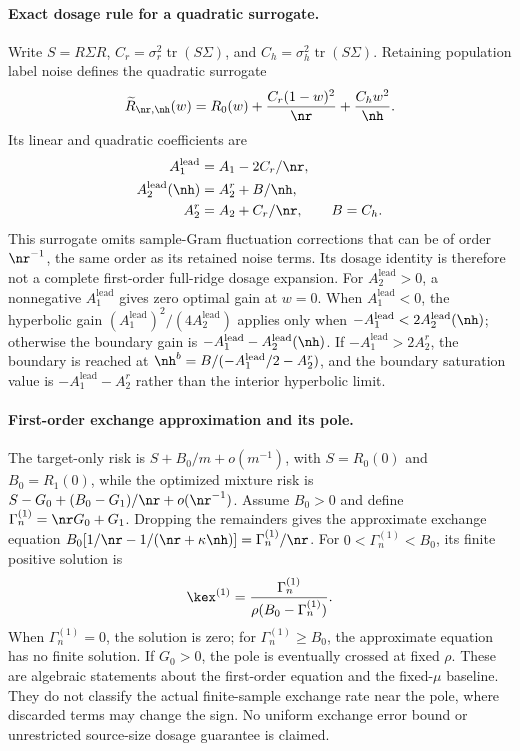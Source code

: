 \paragraph{Exact dosage rule for a quadratic surrogate.}
Write $S=R\Sigma R$, $C_r=\sigma_r^2\operatorname{tr}(S\Sigma)$, and $C_h=\sigma_h^2\operatorname{tr}(S\Sigma)$. Retaining population label noise defines the quadratic surrogate
\begin{equation}
 \widetilde R_{\nr,\nh}(w)=R_0(w)+\frac{C_r(1-w)^2}{\nr}+\frac{C_hw^2}{\nh}.
 \label{supp:eq:surrogate-dose}
\end{equation}
Its linear and quadratic coefficients are
\begin{align}
 A_1^{\mathrm{lead}}&=A_1-2C_r/\nr,\notag\\
 A_2^{\mathrm{lead}}(\nh)&=A_2^r+B/\nh,\notag\\
 A_2^r&=A_2+C_r/\nr,\qquad B=C_h.
\end{align}
This surrogate omits sample-Gram fluctuation corrections that can be of order $\nr^{-1}$, the same order as its retained noise terms. Its dosage identity is therefore not a complete first-order full-ridge dosage expansion. For $A_2^{\mathrm{lead}}>0$, a nonnegative $A_1^{\mathrm{lead}}$ gives zero optimal gain at $w=0$. When $A_1^{\mathrm{lead}}<0$, the hyperbolic gain $(A_1^{\mathrm{lead}})^2/(4A_2^{\mathrm{lead}})$ applies only when $-A_1^{\mathrm{lead}}<2A_2^{\mathrm{lead}}(\nh)$; otherwise the boundary gain is $-A_1^{\mathrm{lead}}-A_2^{\mathrm{lead}}(\nh)$. If $-A_1^{\mathrm{lead}}>2A_2^r$, the boundary is reached at $\nh^b=B/(-A_1^{\mathrm{lead}}/2-A_2^r)$, and the boundary saturation value is $-A_1^{\mathrm{lead}}-A_2^r$ rather than the interior hyperbolic limit.

\paragraph{First-order exchange approximation and its pole.}
The target-only risk is $S+B_0/m+o(m^{-1})$, with $S=R_0(0)$ and $B_0=R_1(0)$, while the optimized mixture risk is $S-G_0+(B_0-G_1)/\nr+o(\nr^{-1})$. Assume $B_0>0$ and define $\Gamma_n^{(1)}=\nr G_0+G_1$. Dropping the remainders gives the approximate exchange equation
$B_0[1/\nr-1/(\nr+\kappa\nh)]=\Gamma_n^{(1)}/\nr$.
For $0<\Gamma_n^{(1)}<B_0$, its finite positive solution is
\begin{equation}
 \kex^{(1)}=\frac{\Gamma_n^{(1)}}{\rho(B_0-\Gamma_n^{(1)})}.
\end{equation}
When $\Gamma_n^{(1)}=0$, the solution is zero; for $\Gamma_n^{(1)}\ge B_0$, the approximate equation has no finite solution. If $G_0>0$, the pole is eventually crossed at fixed $\rho$. These are algebraic statements about the first-order equation and the fixed-$\mu$ baseline. They do not classify the actual finite-sample exchange rate near the pole, where discarded terms may change the sign. No uniform exchange error bound or unrestricted source-size dosage guarantee is claimed.


